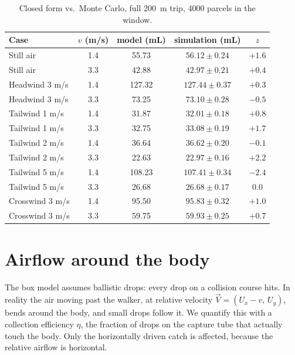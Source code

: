 \documentclass[11pt,a4paper]{article}
\begin{document}
\begin{table}[h]\centering
\caption{Closed form vs.\ Monte Carlo, full \SI{200}{m} trip, 4000 parcels in the window.}\label{tab:mc}
\begin{tabular}{lcccc}\toprule
Case & $v$ (m/s) & model (mL) & simulation (mL) & $z$\\\midrule
Still air & 1.4 & 55.73 & $56.12\pm0.24$ & $+1.6$\\
Still air & 3.3 & 42.88 & $42.97\pm0.21$ & $+0.4$\\
Headwind 3 m/s & 1.4 & 127.32 & $127.44\pm0.37$ & $+0.3$\\
Headwind 3 m/s & 3.3 & 73.25 & $73.10\pm0.28$ & $-0.5$\\
Tailwind 1 m/s & 1.4 & 31.87 & $32.01\pm0.18$ & $+0.8$\\
Tailwind 1 m/s & 3.3 & 32.75 & $33.08\pm0.19$ & $+1.7$\\
Tailwind 2 m/s & 1.4 & 36.64 & $36.62\pm0.20$ & $-0.1$\\
Tailwind 2 m/s & 3.3 & 22.63 & $22.97\pm0.16$ & $+2.2$\\
Tailwind 5 m/s & 1.4 & 108.23 & $107.41\pm0.34$ & $-2.4$\\
Tailwind 5 m/s & 3.3 & 26.68 & $26.68\pm0.17$ & $0.0$\\
Crosswind 3 m/s & 1.4 & 95.50 & $95.83\pm0.32$ & $+1.0$\\
Crosswind 3 m/s & 3.3 & 59.75 & $59.93\pm0.25$ & $+0.7$\\\bottomrule
\end{tabular}
\end{table}

\section{Airflow around the body}\label{sec:aero}
The box model assumes ballistic drops: every drop on a collision course hits. In reality the air moving past the walker, at relative velocity $\vec V=(U_x-v,\,U_y)$, bends around the body, and small drops follow it. We quantify this with a collection efficiency $\eta$, the fraction of drops on the capture tube that actually touch the body. Only the horizontally driven catch is affected, because the relative airflow is horizontal.
\end{document}

